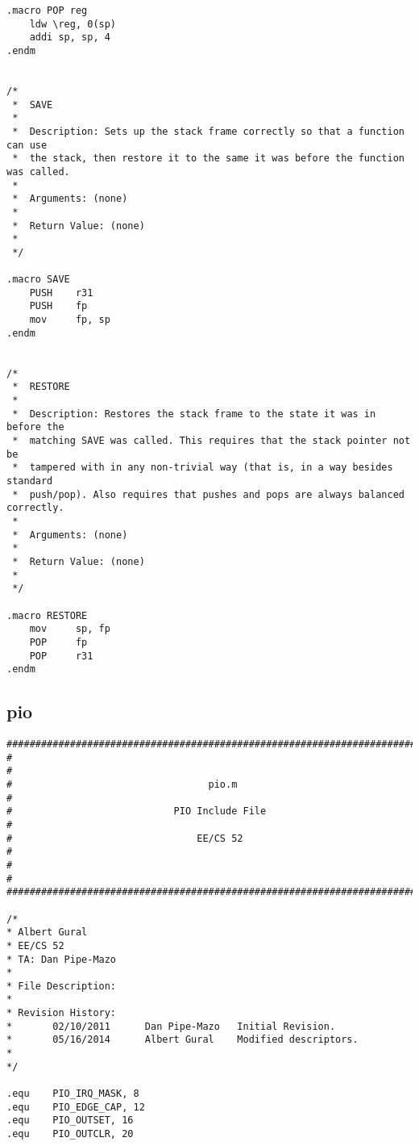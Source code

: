 \begin{lstlisting}
.macro POP reg
	ldw \reg, 0(sp)
	addi sp, sp, 4
.endm


/*
 *  SAVE
 *
 *  Description: Sets up the stack frame correctly so that a function can use
 *  the stack, then restore it to the same it was before the function was called.
 *
 *  Arguments: (none)
 *
 *  Return Value: (none)
 *
 */

.macro SAVE
	PUSH	r31
	PUSH	fp
	mov		fp, sp
.endm


/*
 *  RESTORE
 *
 *  Description: Restores the stack frame to the state it was in before the
 *  matching SAVE was called. This requires that the stack pointer not be
 *  tampered with in any non-trivial way (that is, in a way besides standard
 *  push/pop). Also requires that pushes and pops are always balanced correctly.
 *
 *  Arguments: (none)
 *
 *  Return Value: (none)
 *
 */

.macro RESTORE
	mov		sp, fp
	POP		fp
	POP		r31
.endm
\end{lstlisting}

\subsection{pio}
\begin{lstlisting}
################################################################################
#                                                                              #
#                                  pio.m                                       #
#                            PIO Include File                                  #
#                                EE/CS 52                                      #
#                                                                              #
################################################################################

/*
* Albert Gural
* EE/CS 52
* TA: Dan Pipe-Mazo
*
* File Description: 
*
* Revision History:
* 		02/10/2011 		Dan Pipe-Mazo	Initial Revision.
*		05/16/2014		Albert Gural	Modified descriptors.
*
*/

.equ	PIO_IRQ_MASK, 8
.equ	PIO_EDGE_CAP, 12
.equ	PIO_OUTSET, 16
.equ	PIO_OUTCLR, 20
\end{lstlisting}

